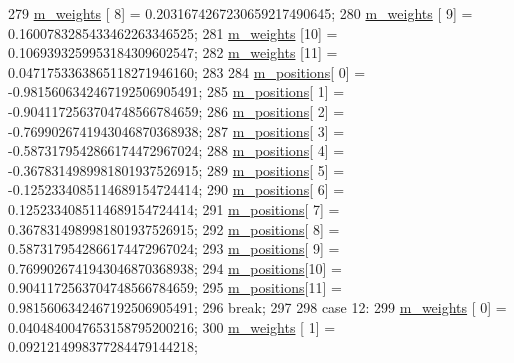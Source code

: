 \begin{DoxyCode}
279       \hyperlink{class_q_u_e_s_o_1_1_base1_d_quadrature_a7117fec020a8098d1c22b604268bad93}{m\_weights}  [ 8] =  0.2031674267230659217490645;
280       \hyperlink{class_q_u_e_s_o_1_1_base1_d_quadrature_a7117fec020a8098d1c22b604268bad93}{m\_weights}  [ 9] =  0.1600783285433462263346525;
281       \hyperlink{class_q_u_e_s_o_1_1_base1_d_quadrature_a7117fec020a8098d1c22b604268bad93}{m\_weights}  [10] =  0.1069393259953184309602547;
282       \hyperlink{class_q_u_e_s_o_1_1_base1_d_quadrature_a7117fec020a8098d1c22b604268bad93}{m\_weights}  [11] =  0.0471753363865118271946160;
283 
284       \hyperlink{class_q_u_e_s_o_1_1_base1_d_quadrature_aeda387c028c3ba89ea0f9637a2234212}{m\_positions}[ 0] = -0.9815606342467192506905491;
285       \hyperlink{class_q_u_e_s_o_1_1_base1_d_quadrature_aeda387c028c3ba89ea0f9637a2234212}{m\_positions}[ 1] = -0.9041172563704748566784659;
286       \hyperlink{class_q_u_e_s_o_1_1_base1_d_quadrature_aeda387c028c3ba89ea0f9637a2234212}{m\_positions}[ 2] = -0.7699026741943046870368938;
287       \hyperlink{class_q_u_e_s_o_1_1_base1_d_quadrature_aeda387c028c3ba89ea0f9637a2234212}{m\_positions}[ 3] = -0.5873179542866174472967024;
288       \hyperlink{class_q_u_e_s_o_1_1_base1_d_quadrature_aeda387c028c3ba89ea0f9637a2234212}{m\_positions}[ 4] = -0.3678314989981801937526915;
289       \hyperlink{class_q_u_e_s_o_1_1_base1_d_quadrature_aeda387c028c3ba89ea0f9637a2234212}{m\_positions}[ 5] = -0.1252334085114689154724414;
290       \hyperlink{class_q_u_e_s_o_1_1_base1_d_quadrature_aeda387c028c3ba89ea0f9637a2234212}{m\_positions}[ 6] =  0.1252334085114689154724414;
291       \hyperlink{class_q_u_e_s_o_1_1_base1_d_quadrature_aeda387c028c3ba89ea0f9637a2234212}{m\_positions}[ 7] =  0.3678314989981801937526915;
292       \hyperlink{class_q_u_e_s_o_1_1_base1_d_quadrature_aeda387c028c3ba89ea0f9637a2234212}{m\_positions}[ 8] =  0.5873179542866174472967024;
293       \hyperlink{class_q_u_e_s_o_1_1_base1_d_quadrature_aeda387c028c3ba89ea0f9637a2234212}{m\_positions}[ 9] =  0.7699026741943046870368938;
294       \hyperlink{class_q_u_e_s_o_1_1_base1_d_quadrature_aeda387c028c3ba89ea0f9637a2234212}{m\_positions}[10] =  0.9041172563704748566784659;
295       \hyperlink{class_q_u_e_s_o_1_1_base1_d_quadrature_aeda387c028c3ba89ea0f9637a2234212}{m\_positions}[11] =  0.9815606342467192506905491;
296     \textcolor{keywordflow}{break};
297 
298     \textcolor{keywordflow}{case} 12:
299       \hyperlink{class_q_u_e_s_o_1_1_base1_d_quadrature_a7117fec020a8098d1c22b604268bad93}{m\_weights}  [ 0] =  0.0404840047653158795200216;
300       \hyperlink{class_q_u_e_s_o_1_1_base1_d_quadrature_a7117fec020a8098d1c22b604268bad93}{m\_weights}  [ 1] =  0.0921214998377284479144218;

\end{DoxyCode}
